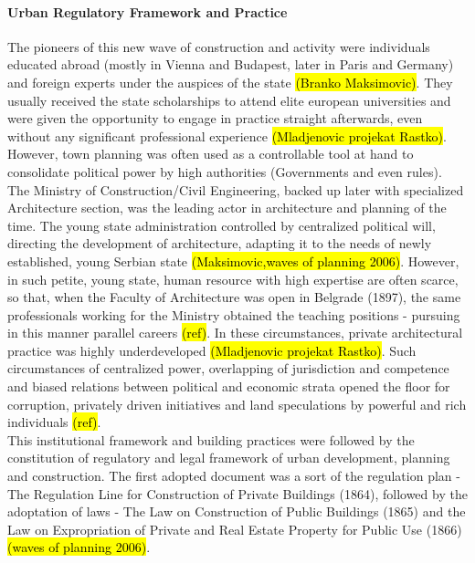 \documentclass[11pt]{report}
\begin{document}
\paragraph{Urban Regulatory Framework and Practice}
The pioneers of this new wave of construction and activity were individuals educated abroad (mostly in Vienna and Budapest, later in Paris and Germany) and foreign experts under the auspices of the state \hl{(Branko Maksimovic)}. They usually received the state scholarships to attend elite european universities and were given the opportunity to engage in practice straight afterwards, even without any significant professional experience \hl{(Mladjenovic projekat Rastko)}.
However, town planning was often used as a controllable tool at hand to consolidate political power by high authorities (Governments and even rules). \footnotemark The Ministry of Construction/Civil Engineering, backed up later with specialized Architecture section, was the leading actor in architecture and planning of the time. The young state administration controlled by centralized political will, directing the development of architecture, adapting it to the needs of newly established, young Serbian state \hl{(Maksimovic,waves of planning 2006)}. However, in such petite, young state, human resource with high expertise are often scarce, so that, when the Faculty of Architecture was open in Belgrade (1897), the same professionals working for the Ministry obtained the teaching positions - pursuing in this manner parallel careers \hl{(ref)}. In these circumstances, private architectural practice was highly underdeveloped \hl{(Mladjenovic projekat Rastko)}. Such circumstances of centralized power, overlapping of jurisdiction and competence and biased relations between political and economic strata opened the floor for corruption, privately driven initiatives and land speculations by powerful and rich individuals \hl{(ref)}.
\\
This institutional framework and building practices were followed by the constitution of regulatory and legal framework of urban development, planning and construction. The first adopted document was a sort of the regulation plan - The Regulation  Line  for  Construction  of  Private  Buildings (1864), followed by the adoptation of laws - The Law on Construction of Public Buildings (1865) and the Law on Expropriation of Private and Real Estate Property for Public Use (1866) \hl{(waves of planning 2006)}.
\end{document}

